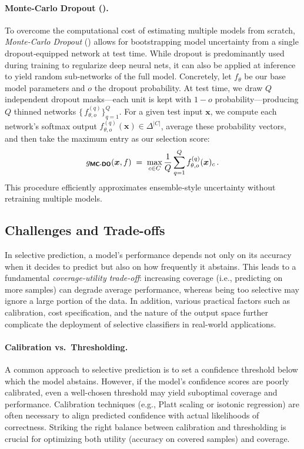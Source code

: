 \paragraph{Monte-Carlo Dropout (\mcdo).}
To overcome the computational cost of estimating multiple models from scratch, \emph{Monte-Carlo Dropout} (\mcdo) \citep{gal2016dropout} allows for bootstrapping model uncertainty from a single dropout‐equipped network at test time. While dropout is predominantly used during training to regularize deep neural nets, it can also be applied at inference to yield random sub‐networks of the full model. Concretely, let \(f_{\theta}\) be our base model parameters and \(o\) the dropout probability. At test time, we draw \(Q\) independent dropout masks—each unit is kept with \(1 - o\) probability—producing \(Q\) thinned networks $\bigl\{\,f_{\theta,o}^{(q)}\bigr\}_{q=1}^{Q}$. For a given test input \(\bm{x}\), we compute each network’s softmax output \(f_{\theta,o}^{(q)}(\bm{x})\in\Delta^{|C|}\), average these probability vectors, and then take the maximum entry as our selection score:
\begin{equation}
  g_{\textbf{\sffamily MC-DO}}(\bm{x},f)
  \;=\;
  \max_{c\in C}
  \frac{1}{Q}
  \sum_{q=1}^{Q}
    f_{\theta,o}^{(q)}(\bm{x})_{c}\,.
\end{equation}
This procedure efficiently approximates ensemble‐style uncertainty without retraining multiple models.  


\subsection{Challenges and Trade-offs}
In selective prediction, a model’s performance depends not only on its accuracy when it decides to predict but also on how frequently it abstains. This leads to a fundamental \emph{coverage-utility trade-off}: increasing coverage (i.e., predicting on more samples) can degrade average performance, whereas being too selective may ignore a large portion of the data. In addition, various practical factors such as calibration, cost specification, and the nature of the output space further complicate the deployment of selective classifiers in real-world applications.

\paragraph{Calibration vs.\ Thresholding.}
A common approach to selective prediction is to set a confidence threshold below which the model abstains. However, if the model’s confidence scores are poorly calibrated, even a well-chosen threshold may yield suboptimal coverage and performance. Calibration techniques (e.g., Platt scaling or isotonic regression) are often necessary to align predicted confidence with actual likelihoods of correctness. Striking the right balance between calibration and thresholding is crucial for optimizing both utility (accuracy on covered samples) and coverage.

